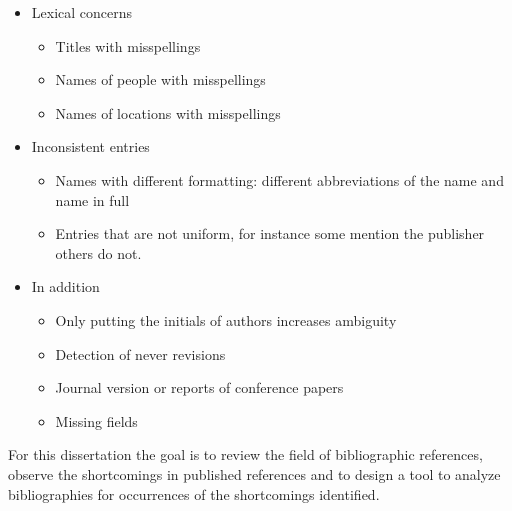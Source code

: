 \begin{itemize}
\item Lexical concerns
  \begin{itemize}
  \item Titles with misspellings
  \item Names of people with misspellings
  \item Names of locations with misspellings
  \end{itemize}
\item Inconsistent entries
  \begin{itemize}
  \item Names with different formatting: different abbreviations of
    the name and name in full
  \item Entries that are not uniform, for instance some mention the
    publisher others do not.
  \end{itemize}
\item In addition
  \begin{itemize}
  \item Only putting the initials of authors increases ambiguity
  \item Detection of never revisions
  \item Journal version or reports of conference papers
  \item Missing fields
  \end{itemize}
\end{itemize}

For this dissertation the goal is to review the field of bibliographic
references, observe the shortcomings in published references and to
design a tool to analyze bibliographies for occurrences of the
shortcomings identified.



